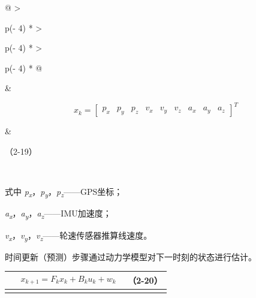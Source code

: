 {\def\LTcaptype{none} %
\begin{longtable}[]{@{}
  >{\raggedright\arraybackslash}p{}
  >{\raggedright\arraybackslash}p{}
  >{\raggedright\arraybackslash}p{}@{}}
\toprule\noalign{}
\begin{minipage}[b]{\linewidth}\centering
\end{minipage} & \begin{minipage}[b]{\linewidth}\centering
\[x_{k} = \begin{bmatrix}
p_{x} & p_{y} & p_{z} & v_{x} & v_{y} & v_{z} & a_{x} & a_{y} & a_{z}
\end{bmatrix}^{T}\]
\end{minipage} & \begin{minipage}[b]{\linewidth}\raggedleft
（2-19）
\end{minipage} \\
\midrule\noalign{}
\endhead
\bottomrule\noalign{}
\endlastfoot
\end{longtable}
}

式中
\emph{p\textsubscript{x}}，\emph{p\textsubscript{y}}，\emph{p\textsubscript{z}}------GPS坐标；

\emph{a\textsubscript{x}}，\emph{a\textsubscript{y}}，\emph{a\textsubscript{z}}------IMU加速度；

\emph{v\textsubscript{x}}，\emph{v\textsubscript{y}}，\emph{v\textsubscript{z}}------轮速传感器推算线速度。

时间更新（预测）步骤通过动力学模型对下一时刻的状态进行估计。

{\def\LTcaptype{none} %
\begin{longtable}[]{@{}
  >{\raggedright\arraybackslash}p{}
  >{\raggedright\arraybackslash}p{}
  >{\raggedright\arraybackslash}p{}@{}}
\toprule\noalign{}
\begin{minipage}[b]{\linewidth}\centering
\end{minipage} & \begin{minipage}[b]{\linewidth}\centering
\[\begin{array}{r}
x_{k + 1} = F_{k}x_{k} + B_{k}u_{k} + w_{k}
\end{array}\]
\end{minipage} & \begin{minipage}[b]{\linewidth}\raggedleft
（2-20）
\end{minipage} \\
\midrule\noalign{}
\endhead
\bottomrule\noalign{}
\endlastfoot
\end{longtable}
}

